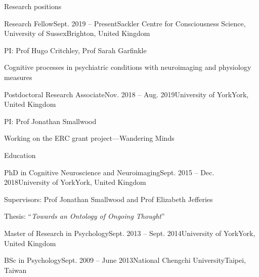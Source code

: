 \documentclass{resume} %
\begin{document}

\begin{rSection}{Research positions}
  \begin{rSubsection}{Research Fellow}{Sept. 2019 -- Present}{Sackler Centre for Consciousness Science, University of Sussex}{Brighton, United Kingdom}
    \item PI: Prof Hugo Critchley, Prof Sarah Garfinkle
    \item Cognitive processes in psychiatric conditions with neuroimaging and physiology measures
  \end{rSubsection}

  \begin{rSubsection}{Postdoctoral Research Associate}{Nov. 2018 -- Aug. 2019}{University of York}{York, United Kingdom}
  \item PI: Prof Jonathan Smallwood
  \item Working on the ERC grant project---Wandering Minds
  \end{rSubsection}

  \end{rSection}


\begin{rSection}{Education}

  \begin{rSubsection}{PhD in Cognitive Neuroscience and Neuroimaging}{Sept. 2015 -- Dec. 2018}{University of York}{York, United Kingdom}
    \item Supervisors: Prof Jonathan Smallwood and Prof Elizabeth Jefferies
    \item Thesis: ``\textit{Towards an Ontology of Ongoing Thought}''
  \end{rSubsection}

  \begin{EDUrSubsection}{Master of Research in Psychology}{Sept. 2013 -- Sept. 2014}{University of York}{York, United Kingdom}
  \end{EDUrSubsection}

  \begin{EDUrSubsection}{BSc in Psychology}{Sept. 2009 -- June 2013}{National Chengchi University}{Taipei, Taiwan}
  \end{EDUrSubsection}

  \end{rSection}
\end{document}
